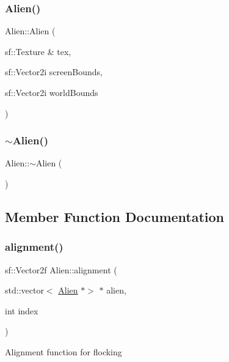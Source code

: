 \subsubsection{\texorpdfstring{Alien()}{Alien()}}
{\footnotesize\ttfamily Alien\+::\+Alien (\begin{DoxyParamCaption}\item[{sf\+::\+Texture \&}]{tex,  }\item[{sf\+::\+Vector2i}]{screen\+Bounds,  }\item[{sf\+::\+Vector2i}]{world\+Bounds }\end{DoxyParamCaption})}

\mbox{\label{class_alien_a7cdfd79d84b51a18003bf41585aedd43}} 
\subsubsection{\texorpdfstring{$\sim$\+Alien()}{~Alien()}}
{\footnotesize\ttfamily Alien\+::$\sim$\+Alien (\begin{DoxyParamCaption}{ }\end{DoxyParamCaption})}



\subsection{Member Function Documentation}
\mbox{\label{class_alien_a9c94d5f45dc31fdda1ef096cf3e60920}} 
\subsubsection{\texorpdfstring{alignment()}{alignment()}}
{\footnotesize\ttfamily sf\+::\+Vector2f Alien\+::alignment (\begin{DoxyParamCaption}\item[{std\+::vector$<$ \hyperlink{class_alien}{Alien} $\ast$$>$ $\ast$}]{alien,  }\item[{int}]{index }\end{DoxyParamCaption})}

Alignment function for flocking \mbox{\label{class_alien_a768bd4e8f7b409f8a7c3b4ac6cdd598f}} 

